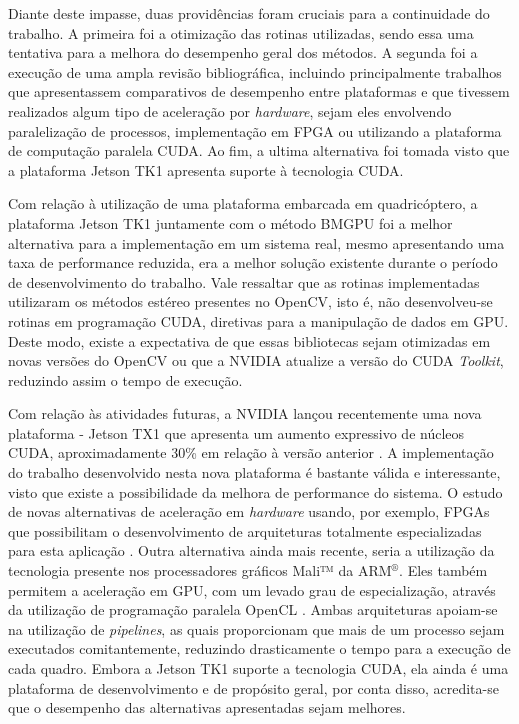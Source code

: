 Diante deste impasse, duas providências foram cruciais para a continuidade do trabalho. A primeira foi a otimização das rotinas utilizadas, sendo essa uma tentativa para a melhora do desempenho geral dos métodos. A segunda foi a execução de uma ampla revisão bibliográfica, incluindo principalmente trabalhos que apresentassem comparativos de desempenho entre plataformas e que tivessem realizados algum tipo de aceleração por \textit{hardware}, sejam eles envolvendo paralelização de processos, implementação em FPGA ou utilizando a plataforma de computação paralela CUDA. Ao fim, a ultima alternativa foi tomada visto que a plataforma Jetson TK1 apresenta suporte à tecnologia CUDA.

Com relação à utilização de uma plataforma embarcada em quadricóptero, a plataforma Jetson TK1 juntamente com o método BMGPU foi a melhor alternativa para a implementação em um sistema real, mesmo apresentando uma taxa de performance reduzida, era a melhor solução existente durante o período de desenvolvimento do trabalho. Vale ressaltar que as rotinas implementadas utilizaram os métodos estéreo presentes no OpenCV, isto é, não desenvolveu-se rotinas em programação CUDA, diretivas para a manipulação de dados em GPU. Deste modo, existe a expectativa de que essas bibliotecas sejam otimizadas em novas versões do OpenCV ou que a NVIDIA atualize a versão do CUDA \textit{Toolkit}, reduzindo assim o tempo de execução.

Com relação às atividades futuras, a NVIDIA lançou recentemente uma nova plataforma - Jetson TX1 que apresenta um aumento expressivo de núcleos CUDA, aproximadamente 30\% em relação à versão anterior \cite{JetsonTX1}. A implementação do trabalho desenvolvido nesta nova plataforma é bastante válida e interessante, visto que existe a possibilidade da melhora de performance do sistema. O estudo de novas alternativas de aceleração em \textit{hardware} usando, por exemplo, FPGAs que possibilitam o desenvolvimento de arquiteturas totalmente especializadas para esta aplicação \cite{Barry2015}. Outra alternativa ainda mais recente, seria a utilização da tecnologia presente nos processadores gráficos Mali™ da ARM$^®$. Eles também permitem a aceleração em GPU, com um levado grau de especialização, através da utilização de programação paralela OpenCL \cite{StereoARM}. Ambas arquiteturas apoiam-se na utilização de \textit{pipelines}, as quais proporcionam que mais de um processo sejam executados comitantemente, reduzindo drasticamente o tempo para a execução de cada quadro. Embora a Jetson TK1 suporte a tecnologia CUDA, ela ainda é uma plataforma de desenvolvimento e de propósito geral, por conta disso, acredita-se que o desempenho das alternativas apresentadas sejam melhores.

